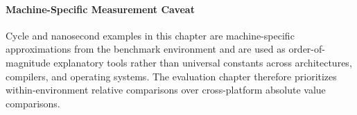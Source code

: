 \paragraph{Machine-Specific Measurement Caveat}
Cycle and nanosecond examples in this chapter are machine-specific approximations from the benchmark environment and are used as order-of-magnitude explanatory tools rather than universal constants across architectures, compilers, and operating systems. The evaluation chapter therefore prioritizes within-environment relative comparisons over cross-platform absolute value comparisons.
